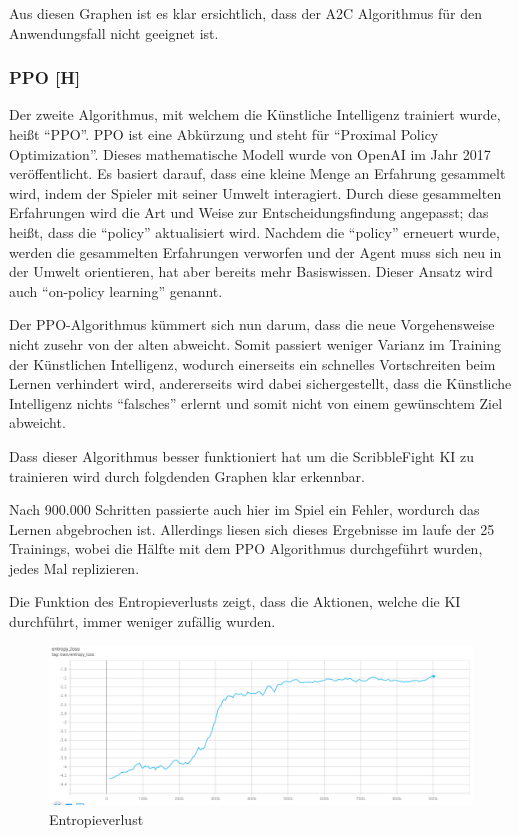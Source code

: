 Aus diesen Graphen ist es klar ersichtlich, dass der A2C Algorithmus für den Anwendungsfall nicht geeignet ist.

\subsubsection{PPO [H]}\label{maai:ppo:head}
Der zweite Algorithmus, mit welchem die Künstliche Intelligenz trainiert wurde, heißt ``PPO''.
PPO ist eine Abkürzung und steht für ``Proximal Policy Optimization''. Dieses mathematische Modell
wurde von OpenAI im Jahr 2017 veröffentlicht. Es basiert darauf, dass eine kleine Menge an Erfahrung gesammelt wird, indem der Spieler mit seiner Umwelt interagiert.
Durch diese gesammelten Erfahrungen wird die Art und Weise zur Entscheidungsfindung angepasst; das heißt, dass die ``policy'' aktualisiert wird.
Nachdem die ``policy'' erneuert wurde, werden die gesammelten Erfahrungen verworfen und der Agent muss sich neu in der Umwelt orientieren, hat aber bereits mehr Basiswissen.
Dieser Ansatz wird auch ``on-policy learning'' genannt.

Der PPO-Algorithmus kümmert sich nun darum, dass die neue Vorgehensweise nicht zusehr von der alten abweicht.
Somit passiert weniger Varianz im Training der Künstlichen Intelligenz, wodurch einerseits ein schnelles Vortschreiten
beim Lernen verhindert wird, andererseits wird dabei sichergestellt, dass die Künstliche Intelligenz nichts ``falsches''
erlernt und somit nicht von einem gewünschtem Ziel abweicht.


Dass dieser Algorithmus besser funktioniert hat um die ScribbleFight KI zu trainieren wird durch folgdenden
Graphen klar erkennbar.

Nach 900.000 Schritten passierte auch hier im Spiel ein Fehler, wordurch das Lernen abgebrochen ist.
Allerdings liesen sich dieses Ergebnisse im laufe der 25 Trainings, wobei die Hälfte mit dem PPO Algorithmus durchgeführt wurden,
jedes Mal replizieren.

Die Funktion des Entropieverlusts zeigt, dass die Aktionen, welche die KI durchführt, immer weniger zufällig
wurden.

\begin{figure}[H]
    \centering
    \includegraphics[scale=0.6]{pics/Tensorboard/PPO/entropy_loss.png}
    \caption{Entropieverlust}
    \label{fig:ppo:entropyloss}
\end{figure}

